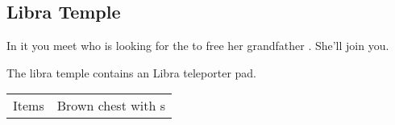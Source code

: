 \subsection{Libra Temple}
\label{map:libra_temple}

In it you meet  who is looking for the  to free her grandfather . She'll join you.

The libra temple contains an Libra teleporter pad.

\noindent\begin{tabularx}{\textwidth}[l]{lX}
	Items & Brown chest with \nameref{weapon:bomb}s
\end{tabularx}

